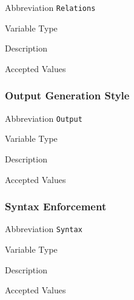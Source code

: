 \begin{AlignedDesc}
  \item[Abbreviation] \texttt{Relations}

  \item[Variable Type]

  \item[Description]

  \item[Accepted Values]

  \begin{AlignedDesc}
    \item[\textellipsis]
  \end{AlignedDesc}

\end{AlignedDesc}

\subsubsection{Output Generation Style}
\label{subsec:output}

\begin{AlignedDesc}
  \item[Abbreviation] \texttt{Output}

  \item[Variable Type]

  \item[Description]

  \item[Accepted Values]

  \begin{AlignedDesc}
    \item[\textellipsis]
  \end{AlignedDesc}

\end{AlignedDesc}

\subsubsection{Syntax Enforcement}
\label{subsec:syntax}

\begin{AlignedDesc}
  \item[Abbreviation] \texttt{Syntax}

  \item[Variable Type]

  \item[Description]

  \item[Accepted Values]

  \begin{AlignedDesc}
    \item[\textellipsis]
  \end{AlignedDesc}

\end{AlignedDesc}

